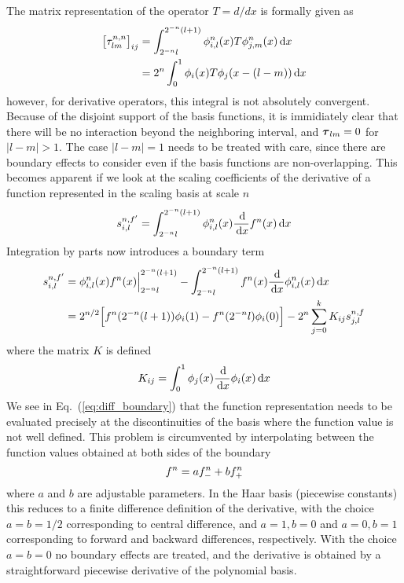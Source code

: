 The matrix representation of the operator $T=d/dx$ is formally given as
\begin{align}
    \big[\tau_{lm}^{n,n}\big]_{ij} &= \int_{2^{-n}l}^{2^{-n}(l+1)} 
        \phi_{i,l}^n(x) T \phi_{j,m}^n(x) \,\mathrm{d} x\\
	&= 2^n \int_0^1 \phi_i(x) T \phi_j(x-(l-m)) \,\mathrm{d} x
\end{align}
however, for derivative operators, this integral is not absolutely convergent. 
Because of the disjoint support of the basis functions, it is immidiately clear that
there will be no interaction beyond the neighboring interval, and $\boldsymbol{\tau}_{lm} = 0$ for
$|l-m| > 1$. The case $|l-m| = 1$ needs to be treated with care, since there are
boundary effects to consider even if the basis functions are non-overlapping. This
becomes apparent if we look at the scaling coefficients of the derivative 
 of a function  represented in the scaling basis 
at scale $n$
\begin{equation}
    s_{i,l}^{n,f'} = \int_{2^{-n}l}^{2^{-n}(l+1)} 
	\phi_{i,l}^n(x) \frac{\,\mathrm{d}}{\,\mathrm{d} x} {f}^{n}(x) \,\mathrm{d} x 
\end{equation}
Integration by parts now introduces a boundary term
\begin{align}
    s_{i,l}^{n,f'} 
	&= \phi_{i,l}^n(x){f}^{n}(x)\Big|_{2^{-n}l}^{2^{-n}(l+1)}
	    - \int_{2^{-n}l}^{2^{-n}(l+1)} 
	    {f}^{n}(x)
	    \frac{\,\mathrm{d}}{\,\mathrm{d} x} \phi_{i,l}^n(x) \,\mathrm{d} x\\
    \label{eq:diff_boundary}
	&= 2^{n/2} \Big[{f}^{n}(2^{-n}(l+1))\phi_i(1) - 
	    {f}^{n}(2^{-n}l)\phi_i(0)\Big] - 2^n\sum_{j=0}^{k} 
	    K_{ij}s_{j,l}^{n,f}
\end{align}
where the matrix $K$ is defined
\begin{equation}
    K_{ij} = \int_0^1 \phi_j(x) \frac{\,\mathrm{d}}{\,\mathrm{d} x} \phi_i(x) \,\mathrm{d} x
\end{equation}
We see in Eq.~(\ref{eq:diff_boundary}) that the function representation 
 needs to be evaluated precisely at the discontinuities of the
basis where the function value is not well defined. This problem is circumvented
by interpolating between the function values obtained at both sides of the boundary
\begin{equation}
    {f}^{n} = a {f}^{n}_{-} + b {f}^{n}_{+}
\end{equation}
where $a$ and $b$ are adjustable parameters. In the Haar basis (piecewise constants)
this reduces to a finite difference definition of the derivative, with the choice 
$a=b=1/2$ corresponding to central difference, and $a=1,b=0$ and $a=0,b=1$ 
corresponding to forward and backward differences, respectively. With the choice
$a=b=0$ no boundary effects are treated, and the derivative is obtained by a 
straightforward piecewise derivative of the polynomial basis. 

